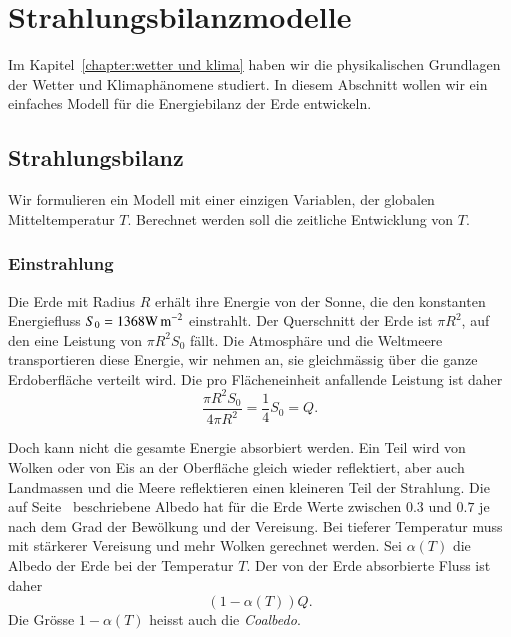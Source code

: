 %
%
%
\section{Strahlungsbilanzmodelle\label{skript:section:bodyko}}
Im Kapitel~\ref{chapter:wetter und klima} haben wir die physikalischen
Grundlagen der Wetter und Klimaphänomene studiert.
In diesem Abschnitt wollen wir ein einfaches Modell für die Energiebilanz
der Erde entwickeln.

\subsection{Strahlungsbilanz\label{skript:subsection:strahlungsbilanz}}
Wir formulieren ein Modell mit einer einzigen Variablen, der globalen
Mitteltemperatur $T$.
Berechnet werden soll die zeitliche Entwicklung von $T$.

\subsubsection{Einstrahlung}
Die Erde mit Radius $R$ erhält ihre Energie von der Sonne, die
den konstanten Energiefluss $S_0 = 1368 \text{W\,m}^{-2}$
einstrahlt.
Der Querschnitt der Erde ist $\pi R^2$, auf den eine Leistung von
$\pi R^2 S_0$ fällt.
Die Atmosphäre und die Weltmeere transportieren diese Energie, wir nehmen
an, sie gleichmässig über die ganze Erdoberfläche verteilt wird.
Die pro Flächeneinheit anfallende Leistung ist daher
\begin{equation}
\frac{\pi R^2 S_0}{4\pi R^2} = \frac14S_0=Q.
\label{skript:bilanz:einstrahlung}
\end{equation}

Doch kann nicht die gesamte Energie absorbiert werden.
Ein Teil wird von Wolken oder von Eis an der Oberfläche 
gleich wieder reflektiert, aber auch Landmassen und die Meere reflektieren
einen kleineren Teil der Strahlung.
Die auf Seite~\pageref{skript:subsubsection:albedo} beschriebene Albedo
hat für die Erde Werte zwischen $0.3$ und $0.7$ je nach dem Grad der
Bewölkung und der Vereisung.
Bei tieferer Temperatur muss mit stärkerer Vereisung und mehr Wolken
gerechnet werden.
Sei $\alpha(T)$ die Albedo der Erde bei der Temperatur $T$.
Der von der Erde absorbierte Fluss ist daher
\begin{equation}
(1-\alpha(T)) Q.
\label{skript:bilanz:ausstrahlung}
\end{equation}
Die Grösse $1-\alpha(T)$ heisst auch die {\em Coalbedo}.
%

